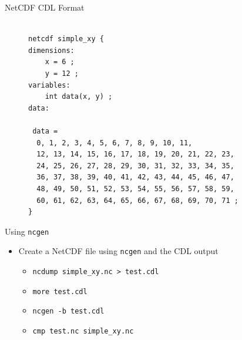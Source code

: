\documentclass[compress,11pt,xcolor=svgnames,aspectratio=169]{beamer}
\begin{document}
\begin{frame}[fragile]{NetCDF CDL Format}

\begin{figure}
\centering
\begin{varwidth}{\linewidth}
{\footnotesize

\begin{verbatim}

netcdf simple_xy {
dimensions:
	x = 6 ;
	y = 12 ;
variables:
	int data(x, y) ;
data:

 data =
  0, 1, 2, 3, 4, 5, 6, 7, 8, 9, 10, 11,
  12, 13, 14, 15, 16, 17, 18, 19, 20, 21, 22, 23,
  24, 25, 26, 27, 28, 29, 30, 31, 32, 33, 34, 35,
  36, 37, 38, 39, 40, 41, 42, 43, 44, 45, 46, 47,
  48, 49, 50, 51, 52, 53, 54, 55, 56, 57, 58, 59,
  60, 61, 62, 63, 64, 65, 66, 67, 68, 69, 70, 71 ;
}

\end{verbatim}

}
\end{varwidth}
\end{figure}

\end{frame}

\begin{frame}[fragile]{Using \texttt{ncgen}}

\begin{itemize}

  \item Create a NetCDF file using \verb|ncgen| and the CDL output

    \begin{itemize}

      \item \verb|ncdump simple_xy.nc > test.cdl|
      \item \verb|more test.cdl|
      \item \verb|ncgen -b test.cdl|
      \item \verb|cmp test.nc simple_xy.nc|

    \end{itemize}

\end{itemize}

\end{frame}
\end{document}
